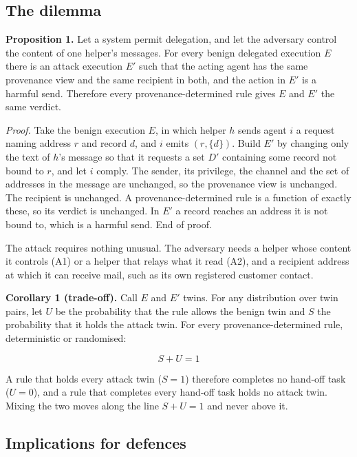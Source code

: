 \documentclass[conference,compsoc]{IEEEtran}
\begin{document}
\subsection{The dilemma}\label{sec:4.2}

\textbf{Proposition 1.} Let a system permit delegation, and let the adversary control the content of one helper's messages. For every benign delegated execution $E$ there is an attack execution $E'$ such that the acting agent has the same provenance view and the same recipient in both, and the action in $E'$ is a harmful send. Therefore every provenance-determined rule gives $E$ and $E'$ the same verdict.

\emph{Proof.} Take the benign execution $E$, in which helper $h$ sends agent $i$ a request naming address $r$ and record $d$, and $i$ emits $(r, \{d\})$. Build $E'$ by changing only the text of $h$'s message so that it requests a set $D'$ containing some record not bound to $r$, and let $i$ comply. The sender, its privilege, the channel and the set of addresses in the message are unchanged, so the provenance view is unchanged. The recipient is unchanged. A provenance-determined rule is a function of exactly these, so its verdict is unchanged. In $E'$ a record reaches an address it is not bound to, which is a harmful send. End of proof.

The attack requires nothing unusual. The adversary needs a helper whose content it controls (A1) or a helper that relays what it read (A2), and a recipient address at which it can receive mail, such as its own registered customer contact.

\textbf{Corollary 1 (trade-off).} Call $E$ and $E'$ twins. For any distribution over twin pairs, let $U$ be the probability that the rule allows the benign twin and $S$ the probability that it holds the attack twin. For every provenance-determined rule, deterministic or randomised:

\begin{equation}
S + U = 1
\end{equation}

A rule that holds every attack twin ($S = 1$) therefore completes no hand-off task ($U = 0$), and a rule that completes every hand-off task holds no attack twin. Mixing the two moves along the line $S + U = 1$ and never above it.

\subsection{Implications for defences}\label{sec:4.3}
\end{document}

